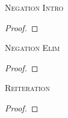 \begin{multicols}{2}
\noindent\textsc{Negation Intro}

\begin{proof}
	\open
		 \as{}
	\close
	 
\end{proof}
\bigskip


\noindent\textsc{Negation Elim}\label{ProofRules-end}

\begin{proof}
	\open
		 \as{}
	\close
	 
\end{proof}
\bigskip


\noindent\textsc{Reiteration}

\begin{proof}
	 
\end{proof}


\vfill\null

\begin{comment}
\section{Derived rules for TFL}

\textsc{Dilemma}

\begin{proof}
	\have[m]{ab}{\meta{A}\eor\meta{B}}
	\have[n]{ac}{\meta{A}\eif\meta{C}}
	\have[p]{bc}{\meta{B}\eif\meta{C}}
	\have[\ ]{a}{\meta{C}} \by{DIL}{ab,ac,bc}
\end{proof}
\bigskip

\textsc{Modus Tollens}

\begin{proof}
	\have[m]{ab}{\meta{A}\eif\meta{B}}
	\have[n]{a}{\enot\meta{B}}
	\have[\ ]{b}{\enot\meta{A}} \by{MT}{ab,a}
\end{proof}
\bigskip

\textsc{Hypothetical Syllogism}

\begin{proof}
	\have[m]{ab}{\meta{A}\eif\meta{B}}
	\have[n]{bc}{\meta{B}\eif\meta{C}}
	\have[\ ]{ac}{\meta{A}\eif\meta{C}}\by{HS}{ab,bc}
\end{proof}

\end{comment}

\end{multicols}

